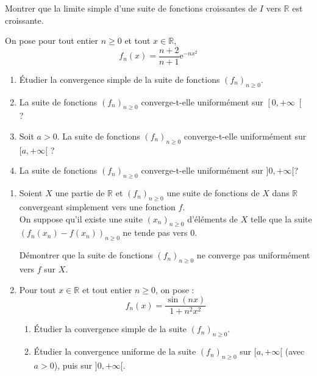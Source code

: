 \documentclass[a4paper,twoside,french,11pt]{VcCours}
\begin{document}
\begin{Exercice}{} Montrer que la limite simple d'une suite de fonctions croissantes de $I$ vers $\mathbb{R}$ est croissante.
\end{Exercice}

\begin{Exercice}{} On pose pour tout entier $n \geq 0$ et tout $x \in \mathbb{R}$,
$$f_{n}(x) =\dfrac{n+2}{n+1}\mathrm{e}^{-n x^{2}}$$
\begin{enumerate}
\item Étudier la convergence simple de la suite de fonctions $\left(f_{n}\right) _{n \geq 0}$.
\item La suite de fonctions  $\left(f_{n}\right) _{n \geq 0}$ converge-t-elle uniformément sur $\left[ 0,+\infty\right[$ ?
\item Soit $a>0$. La suite de fonctions $\left(f_{n}\right) _{n \geq 0}$ converge-t-elle uniformément sur  $[a,+\infty[$ ?	
\item La suite de fonctions  $\left(f_{n}\right) _{n \geq 0}$ converge-t-elle uniformément sur $]0,+\infty[$? 
\end{enumerate}
\end{Exercice}

\begin{Exercice}{} \begin{enumerate}
\item Soient $X$ une partie de $\mathbb{R}$ et $\left( f_{n}\right) _{n \geq 0}$ une suite de fonctions de $X$ dans $\mathbb{R}$ convergeant simplement vers une fonction $f$. \\
On suppose qu'il existe une suite $\left( x_{n}\right)_{n \geq 0}$ d'éléments de $X$ telle que la suite $\left( f_{n}(x_{n})-f\left( x_{n}\right) \right) _{n \geq 0}$ ne tende pas vers $0$. \medskip

Démontrer que la suite de fonctions $\left( f_{n}\right) _{n \geq 0}$ ne converge pas uniformément vers $f$ sur $X$.

\item Pour tout $x\in\mathbb{R}$ et tout entier $n \geq 0$, on pose :
$$f_{n}(x) =\dfrac{\sin \left( nx\right) }{1+n^{2}x^{2}}$$
	\begin{enumerate}
	\item Étudier la convergence simple de la suite $\left( f_{n}\right)_{n \geq 0}$.
	\item Étudier la convergence uniforme de la suite $\left( f_{n}\right)_{n \geq 0}$ sur $[a,+\infty[$ (avec $a>0$),  puis sur $]0,+\infty[$.
	\end{enumerate}
\end{enumerate}
\end{Exercice}
\end{document}

